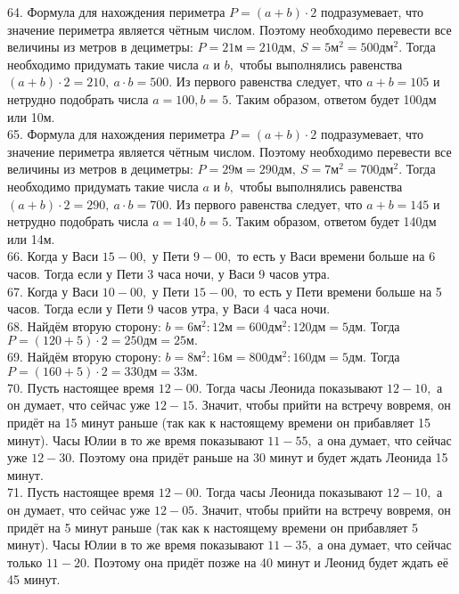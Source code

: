 64. Формула для нахождения периметра $P=(a+b)\cdot2$ подразумевает, что значение периметра является чётным числом. Поэтому необходимо перевести все величины из метров в дециметры: $P=21\text{м}=210\text{дм},\ S=5\text{м}^2=500\text{дм}^2.$ Тогда необходимо придумать такие числа $a$ и $b,$ чтобы выполнялись равенства $(a+b)\cdot2=210,\ a\cdot b=500.$ Из первого равенства следует, что $a+b=105$ и нетрудно подобрать числа $a=100, b=5.$ Таким образом, ответом будет 100дм или 10м.\\
65. Формула для нахождения периметра $P=(a+b)\cdot2$ подразумевает, что значение периметра является чётным числом. Поэтому необходимо перевести все величины из метров в дециметры: $P=29\text{м}=290\text{дм},\ S=7\text{м}^2=700\text{дм}^2.$ Тогда необходимо придумать такие числа $a$ и $b,$ чтобы выполнялись равенства $(a+b)\cdot2=290,\ a\cdot b=700.$ Из первого равенства следует, что $a+b=145$ и нетрудно подобрать числа $a=140, b=5.$ Таким образом, ответом будет 140дм или 14м.\\
66. Когда у Васи $15-00,$ у Пети $9-00,$ то есть у Васи времени больше на 6 часов. Тогда если у Пети 3 часа ночи, у Васи 9 часов утра.\\
67. Когда у Васи $10-00,$ у Пети $15-00,$ то есть у Пети времени больше на 5 часов. Тогда если у Пети 9 часов утра, у Васи 4 часа ночи.\\
68. Найдём вторую сторону: $b=6\text{м}^2:12\text{м}=600\text{дм}^2:120\text{дм}=5\text{дм}.$ Тогда $P=(120+5)\cdot2=250\text{дм}=25\text{м}.$\\
69. Найдём вторую сторону: $b=8\text{м}^2:16\text{м}=800\text{дм}^2:160\text{дм}=5\text{дм}.$ Тогда $P=(160+5)\cdot2=330\text{дм}=33\text{м}.$\\
70. Пусть настоящее время $12-00.$ Тогда часы Леонида показывают $12-10,$ а он думает, что сейчас уже $12-15.$ Значит, чтобы прийти на встречу вовремя, он придёт на 15 минут раньше (так как к настоящему времени он прибавляет 15 минут). Часы Юлии в то же время показывают $11-55,$ а она думает, что сейчас уже $12-30.$ Поэтому она придёт раньше на 30 минут и будет ждать Леонида 15 минут.\\
71. Пусть настоящее время $12-00.$ Тогда часы Леонида показывают $12-10,$ а он думает, что сейчас уже $12-05.$ Значит, чтобы прийти на встречу вовремя, он придёт на 5 минут раньше (так как к настоящему времени он прибавляет 5 минут). Часы Юлии в то же время показывают $11-35,$ а она думает, что сейчас только $11-20.$ Поэтому она придёт позже на 40 минут и Леонид будет ждать её 45 минут.\\
